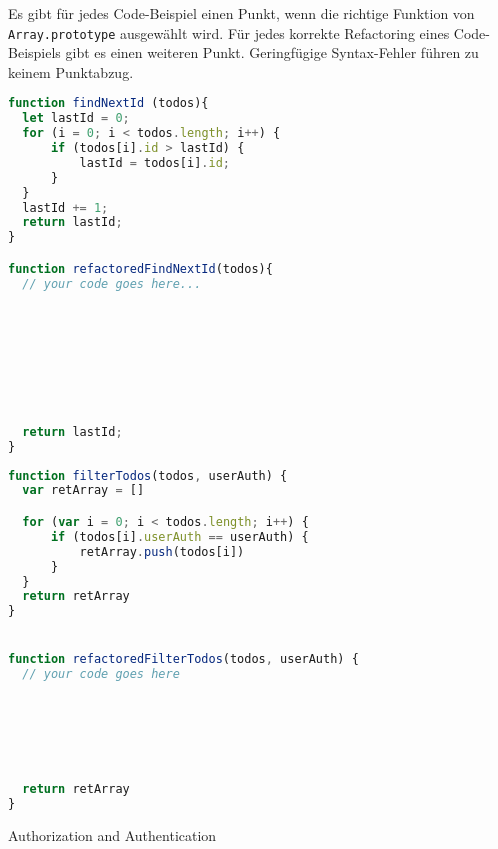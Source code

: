 \documentclass[
addpoints,a4paper,ngerman,answers
]{exam}
\begin{document}
\begin{questions}
\begin{parts}
  Es gibt für jedes Code-Beispiel einen Punkt, wenn die richtige Funktion von
  \texttt{Array.prototype} ausgewählt wird.
  Für jedes korrekte Refactoring eines Code-Beispiels gibt es einen weiteren
  Punkt. Geringfügige Syntax-Fehler führen zu keinem Punktabzug.
  \begin{subparts}
  \subpart[2]
\begin{lstlisting}[extendedchars=true,basicstyle=\ttfamily,language=JavaScript]
function findNextId (todos){
  let lastId = 0;
  for (i = 0; i < todos.length; i++) {
      if (todos[i].id > lastId) {
          lastId = todos[i].id;
      }
  }
  lastId += 1;
  return lastId;
}

function refactoredFindNextId(todos){
  // your code goes here...








  return lastId;
}
\end{lstlisting}
\newpage
\subpart[2]
\begin{lstlisting}[extendedchars=true,basicstyle=\ttfamily,language=JavaScript]
function filterTodos(todos, userAuth) {
  var retArray = []

  for (var i = 0; i < todos.length; i++) {
      if (todos[i].userAuth == userAuth) {
          retArray.push(todos[i])
      }
  }
  return retArray
}


function refactoredFilterTodos(todos, userAuth) {
  // your code goes here






  return retArray
}
\end{lstlisting}
  \end{subparts}
\end{parts}


\question Authorization and Authentication
\end{questions}
\end{document}
